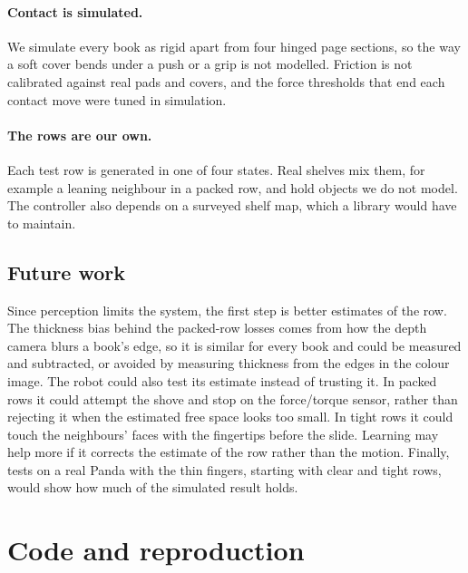 \documentclass{article}
\begin{document}
\paragraph{Contact is simulated.} We simulate every book as rigid apart from four hinged page sections,
so the way a soft cover bends under a push or a grip is not modelled. Friction is not calibrated against real
pads and covers, and the force thresholds that end each contact move were tuned in simulation.

\paragraph{The rows are our own.} Each test row is generated in one of four states. Real shelves mix
them, for example a leaning neighbour in a packed row, and hold objects we do not model. The controller
also depends on a surveyed shelf map, which a library would have to maintain.

\subsection{Future work}
Since perception limits the system, the first step is better estimates of the row. The thickness bias
behind the packed-row losses comes from how the depth camera blurs a book's edge, so it is similar for
every book and could be measured and subtracted, or avoided by measuring thickness from the edges in the
colour image. The robot could also test its estimate instead of
trusting it. In packed rows it could attempt the shove and stop on the force/torque sensor, rather than
rejecting it when the estimated free space looks too small. In tight rows it could touch the neighbours'
faces with the fingertips before the slide. Learning may help more if it corrects the estimate of the row
rather than the motion. Finally, tests on a real Panda with the thin fingers, starting with clear and
tight rows, would show how much of the simulated result holds.




\appendix

\section{Code and reproduction}
\label{app:code}
\end{document}
